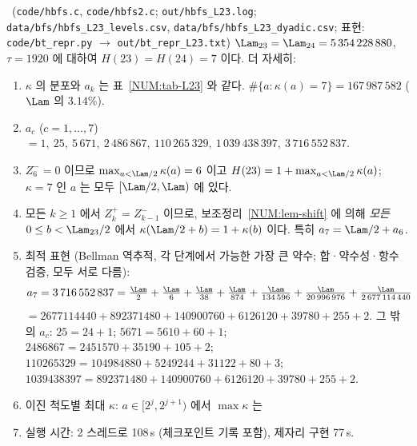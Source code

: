\begin{theorem}[수치 결과]\label{NUM:thm-H23}
\NUMERIC\ (\texttt{code/hbfs.c}, \texttt{code/hbfs2.c}; \texttt{out/hbfs\_L23.log};
\texttt{data/bfs/hbfs\_L23\_levels.csv}, \texttt{data/bfs/hbfs\_L23\_dyadic.csv};
표현: \texttt{code/bt\_repr.py} $\to$ \texttt{out/bt\_repr\_L23.txt})
$\Lam_{23}=\Lam_{24}=5\,354\,228\,880$, $\tau=1920$ 에 대하여 $H(23)=H(24)=7$ 이다. 더 자세히:
\begin{enumerate}[label=(\arabic*)]
\item $\kappa$ 의 분포와 $a_k$ 는 표~\ref{NUM:tab-L23} 와 같다. $\#\{a:\kappa(a)=7\}=167\,987\,582$ ($\Lam$ 의 $3.14\%$).
\item $a_c$ ($c=1,\dots,7$) $=1,\ 25,\ 5\,671,\ 2\,486\,867,\ 110\,265\,329,\ 1\,039\,438\,397,\ 3\,716\,552\,837$.
\item $Z^-_6=0$ 이므로 $\max_{a<\Lam/2}\kappa(a)=6$ 이고 $H(23)=1+\max_{a<\Lam/2}\kappa(a)$; $\kappa=7$ 인 $a$ 는 모두 $[\Lam/2,\Lam)$ 에 있다.
\item 모든 $k\ge1$ 에서 $Z^+_k=Z^-_{k-1}$ 이므로, 보조정리~\ref{NUM:lem-shift} 에 의해
\emph{모든} $0\le b<\Lam_{23}/2$ 에서 $\kappa(\Lam/2+b)=1+\kappa(b)$ 이다. 특히 $a_7=\Lam/2+a_6$.
\item 최적 표현 (Bellman 역추적, 각 단계에서 가능한 가장 큰 약수; 합·약수성·항수 검증, 모두 서로 다름):
\[
a_7=3\,716\,552\,837=\tfrac{\Lam}{2}+\tfrac{\Lam}{6}+\tfrac{\Lam}{38}+\tfrac{\Lam}{874}+\tfrac{\Lam}{134\,596}+\tfrac{\Lam}{20\,996\,976}+\tfrac{\Lam}{2\,677\,114\,440}
\]
$=2677114440+892371480+140900760+6126120+39780+255+2$.
그 밖의 $a_c$: $25=24+1$; $5671=5610+60+1$; $2486867=2451570+35190+105+2$;
$110265329=104984880+5249244+31122+80+3$; $1039438397=892371480+140900760+6126120+39780+255+2$.
\item 이진 척도별 최대 $\kappa$: $a\in[2^j,2^{j+1})$ 에서 $\max\kappa$ 는
\item 실행 시간: 2 스레드로 108\,s (체크포인트 기록 포함), 제자리 구현 77\,s.
\end{enumerate}
\end{theorem}

\begin{table}[ht]\centering\small
\caption{$L=23$ ($\Lam=5\,354\,228\,880$): BFS 단계별 자료. $a_k=\min([0,\Lam)\setminus R_{k-1})$,
$Z^\pm_k$ 는 아래/위 절반에서 $R_k$ 에 없는 수의 개수. \NUMERIC\ (\texttt{data/bfs/hbfs\_L23\_levels.csv})}\label{NUM:tab-L23}
\end{table}


